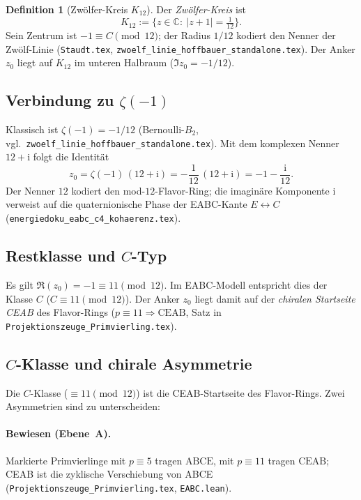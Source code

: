 \documentclass[11pt,a4paper]{article}
\theoremstyle{definition}
\newtheorem{definition}{Definition}[section]
\theoremstyle{remark}
\newcommand{\C}{\mathbb{C}}
\begin{document}
\begin{definition}[Zwölfer-Kreis $K_{12}$]
Der \emph{Zwölfer-Kreis} ist
\[
K_{12}:=\{z\in\C:\ |z+1|=\tfrac{1}{12}\}.
\]
Sein Zentrum ist $-1\equiv C\pmod{12}$; der Radius $1/12$ kodiert
den Nenner der Zwölf-Linie (\texttt{Staudt.tex},
\texttt{zwoelf\_linie\_hoffbauer\_standalone.tex}).
Der Anker $z_0$ liegt auf $K_{12}$ im unteren Halbraum
($\Im z_0=-1/12$).
\end{definition}

\subsection{Verbindung zu \texorpdfstring{$\zeta(-1)$}{zeta(-1)}}

Klassisch ist $\zeta(-1)=-1/12$ (Bernoulli-$B_2$, vgl.\
\texttt{zwoelf\_linie\_hoffbauer\_standalone.tex}). Mit dem
komplexen Nenner $12+\mathrm{i}$ folgt die Identität
\[
z_0 = \zeta(-1)\,(12+\mathrm{i}) = -\frac{1}{12}\,(12+\mathrm{i})
    = -1 - \frac{\mathrm{i}}{12}.
\]
Der Nenner $12$ kodiert den mod-$12$-Flavor-Ring; die imaginäre
Komponente $\mathrm{i}$ verweist auf die quaternionische Phase der
EABC-Kante $E\leftrightarrow C$ (\texttt{energiedoku\_eabc\_c4\_kohaerenz.tex}).

\subsection{Restklasse und $C$-Typ}

Es gilt $\Re(z_0)=-1\equiv 11\pmod{12}$. Im EABC-Modell entspricht
dies der Klasse $C$ ($C\equiv 11\pmod{12}$). Der Anker $z_0$ liegt
damit auf der \emph{chiralen Startseite CEAB} des Flavor-Rings
($p\equiv 11\Rightarrow\mathrm{CEAB}$, Satz in
\texttt{Projektionszeuge\_Primvierling.tex}).

\subsection{\texorpdfstring{$C$}{C}-Klasse und chirale Asymmetrie}
\label{sec:c-asymmetrie}

Die $C$-Klasse ($\equiv 11\pmod{12}$) ist die CEAB-Startseite des
Flavor-Rings. Zwei Asymmetrien sind zu unterscheiden:

\paragraph{Bewiesen (Ebene~A).}
Markierte Primvierlinge mit $p\equiv 5$ tragen $\mathrm{ABCE}$,
mit $p\equiv 11$ tragen $\mathrm{CEAB}$; CEAB ist die zyklische
Verschiebung von ABCE (\texttt{Projektionszeuge\_Primvierling.tex},
\texttt{EABC.lean}).
\end{document}
